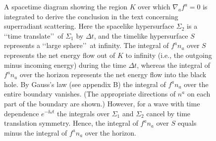 
\begingroup
\renewcommand{\thefigure}{12.8}
\begin{figure}[H]
  \centering
  \caption{A spacetime diagram showing the region \(K\) over which
  \(\nabla_a f^a=0\) is integrated to derive the conclusion in the text concerning
  superradiant scattering. Here the spacelike hypersurface \(\Sigma_2\) is a
  \lq\lq time translate\rq\rq\ of \(\Sigma_1\) by \(\Delta t\), and the timelike
  hypersurface \(S\) represents a \lq\lq large sphere\rq\rq\ at infinity. The integral
  of \(f^a n_a\) over \(S\) represents the net energy flow out of \(K\) to infinity
  (i.e., the outgoing minus incoming energy) during the time \(\Delta t\), whereas
  the integral of \(f^a n_a\) over the horizon represents the net energy flow into the
  black hole. By Gauss's law (see appendix B) the integral of \(f^a n_a\) over the
  entire boundary vanishes. (The appropriate directions of \(n^a\) on each part of
  the boundary are shown.) However, for a wave with time dependence \(e^{-\ii\omega t}\)
  the integrals over \(\Sigma_1\) and \(\Sigma_2\) cancel by time translation symmetry.
  Hence, the integral of \(f^a n_a\) over \(S\) equals minus the integral of
  \(f^a n_a\) over the horizon.}
  \label{fig:12.8}
\end{figure}
\endgroup
